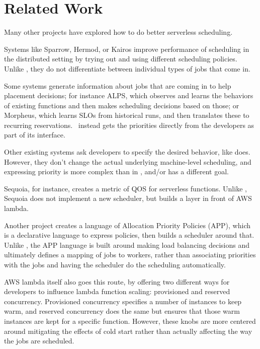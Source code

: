 \section{Related Work}

Many other projects have explored how to do better serverless scheduling.
 
Systems like Sparrow\cite{TODO}, Hermod\cite{TODO}, or Kairos\cite{TODO} improve
performance of scheduling in the distributed setting by trying out and using
different scheduling policies. Unlike \sys{}, they do not differentiate between
individual types of jobs that come in.


Some systems generate information about jobs that are coming in to help
placement decisions; for instance ALPS\cite{TODO}, which observes and learns the
behaviors of existing functions and then makes scheduling decisions based on
those; or Morpheus\cite{TODO}, which learns SLOs from historical runs, and then
translates these to recurring reservations.\ \sys{} instead gets the priorities
directly from the developers as part of its interface.


Other existing systems ask developers to specify the desired behavior, like
\sys{} does. However, they don't change the actual underlying machine-level
scheduling, and expressing priority is more complex than in \sys{}, and/or has a
different goal.

Sequoia\cite{TODO}, for instance, creates a metric of QOS for serverless
functions. Unlike \sys{}, Sequoia does not implement a new scheduler, but builds
a layer in front of AWS lambda. 

Another project\cite{TODO} creates a language of Allocation Priority Policies
(APP), which is a declarative language to express policies, then builds a
scheduler around that. Unlike \sys{}, the APP language is built around making
load balancing decisions and ultimately defines a mapping of jobs to workers,
rather than associating priorities with the jobs and having the scheduler do the
scheduling automatically.

AWS lambda itself also goes this route, by offering two different ways for
developers to influence lambda function scaling: provisioned and reserved
concurrency\cite{TODO}. Provisioned concurrency specifies a number of instances
to keep warm, and reserved concurrency does the same but ensures that those warm
instances are kept for a specific function. However, these knobs are more
centered around mitigating the effects of cold start rather than actually
affecting the way the  jobs are scheduled.
